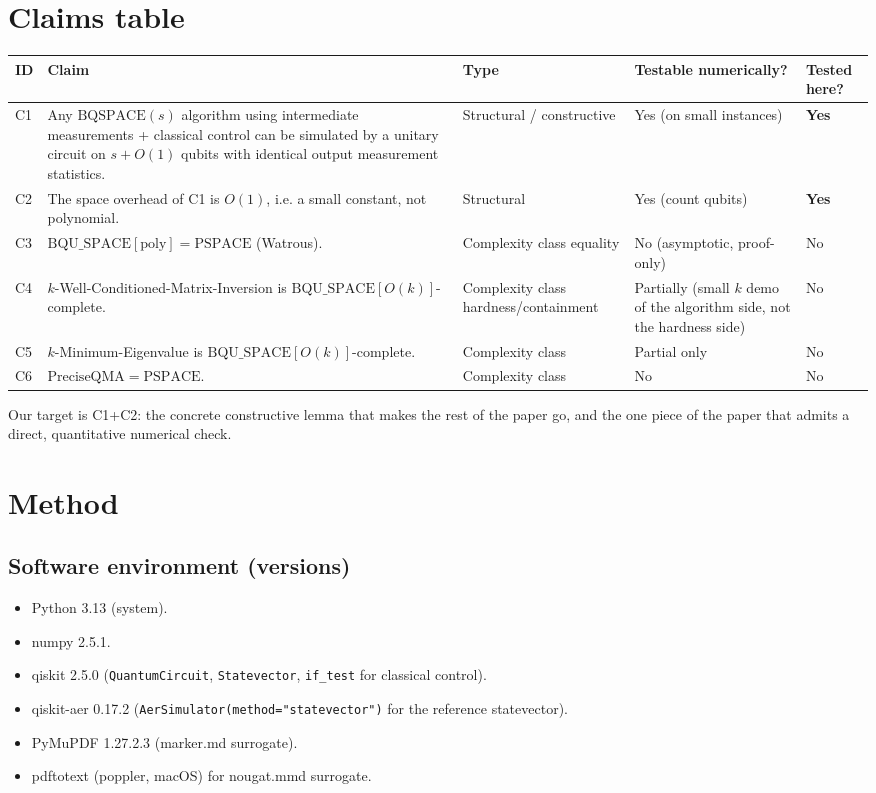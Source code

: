 \documentclass[11pt]{article}
\begin{document}
\section{Claims table}\label{sec:claims}
\begin{longtable}{@{}p{0.5cm}p{7cm}p{2.6cm}p{2cm}p{2cm}@{}}
\toprule
ID & Claim & Type & Testable numerically? & Tested here? \\
\midrule
C1 & Any $\mathrm{BQSPACE}(s)$ algorithm using intermediate measurements + classical control can be simulated by a unitary circuit on $s+O(1)$ qubits with identical output measurement statistics. & Structural / constructive & Yes (on small instances) & \textbf{Yes} \\
C2 & The space overhead of C1 is $O(1)$, i.e. a small constant, not polynomial. & Structural & Yes (count qubits) & \textbf{Yes} \\
C3 & $\mathrm{BQU\_SPACE}[\mathrm{poly}] = \mathrm{PSPACE}$ (Watrous). & Complexity class equality & No (asymptotic, proof-only) & No \\
C4 & $k$-Well-Conditioned-Matrix-Inversion is $\mathrm{BQU\_SPACE}[O(k)]$-complete. & Complexity class hardness/containment & Partially (small $k$ demo of the algorithm side, not the hardness side) & No \\
C5 & $k$-Minimum-Eigenvalue is $\mathrm{BQU\_SPACE}[O(k)]$-complete. & Complexity class & Partial only & No \\
C6 & $\mathrm{PreciseQMA} = \mathrm{PSPACE}$. & Complexity class & No & No \\
\bottomrule
\end{longtable}
Our target is C1+C2: the concrete constructive lemma that makes the rest of the paper go, and the one
piece of the paper that admits a direct, quantitative numerical check.

\section{Method}\label{sec:method}
\subsection{Software environment (versions)}
\begin{itemize}
  \item Python 3.13 (system).
  \item numpy 2.5.1.
  \item qiskit 2.5.0 (\texttt{QuantumCircuit}, \texttt{Statevector}, \texttt{if\_test} for classical control).
  \item qiskit-aer 0.17.2 (\texttt{AerSimulator(method="statevector")} for the reference statevector).
  \item PyMuPDF 1.27.2.3 (marker.md surrogate).
  \item pdftotext (poppler, macOS) for nougat.mmd surrogate.
\end{itemize}
\end{document}
